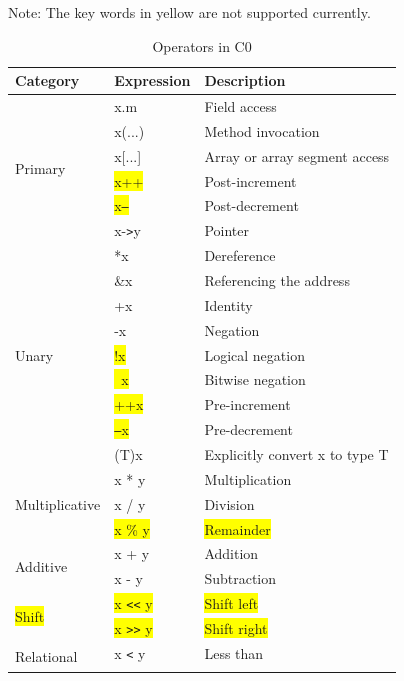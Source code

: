 \documentclass[a4paper]{article}
\begin{document}
\begin{table}[htbp]
\centering
\caption{Operators in C0}
\begin{tablenotes}
\centering
\small
\item Note: The key words in yellow are not supported currently.
\end{tablenotes}
\begin{tabular}{|l|l|l|}
\hline
Category & Expression & Description\\
\hline
\multirow{6}{*}{Primary} & x.m & Field access\\\cline{2-3}
 & x(...) & Method invocation\\\cline{2-3}
 & x[...] & Array or array segment access\\\cline{2-3}
 & \colorbox{yellow}{x++} & Post-increment\\\cline{2-3}
 & \colorbox{yellow}{x\texttt{--}} & Post-decrement\\\cline{2-3}
 & x-\texttt{>}y & Pointer\\ \hline
\multirow{9}{*}{Unary} & *x & Dereference\\\cline{2-3}
 & \&x & Referencing the address\\\cline{2-3}
 & +x & Identity\\\cline{2-3}
 & -x & Negation\\\cline{2-3}
 & \colorbox{yellow}{!x} & Logical negation\\\cline{2-3}
 & \colorbox{yellow}{~x} & Bitwise negation\\\cline{2-3}
 & \colorbox{yellow}{++x} & Pre-increment\\\cline{2-3}
 & \colorbox{yellow}{\texttt{--}x} & Pre-decrement\\\cline{2-3}
 & (T)x & Explicitly convert x to type T\\ \hline
\multirow{3}{*}{Multiplicative} & x * y & Multiplication\\\cline{2-3}
 & x / y & Division\\\cline{2-3}
 & \colorbox{yellow}{x \% y} & \colorbox{yellow}{Remainder}\\ \hline
\multirow{2}{*}{Additive} & x + y & Addition\\\cline{2-3}
 & x - y & Subtraction\\ \hline
\multirow{2}{*}{\colorbox{yellow}{Shift}} & \colorbox{yellow}{x \texttt{<<} y} & \colorbox{yellow}{Shift left}\\\cline{2-3}
 & \colorbox{yellow}{x \texttt{>>} y} & \colorbox{yellow}{Shift right}\\ \hline
\multirow{4}{*}{Relational} & x \texttt{<} y & Less than\\\cline{2-3}

\end{tabular}
\end{table}
\end{document}
